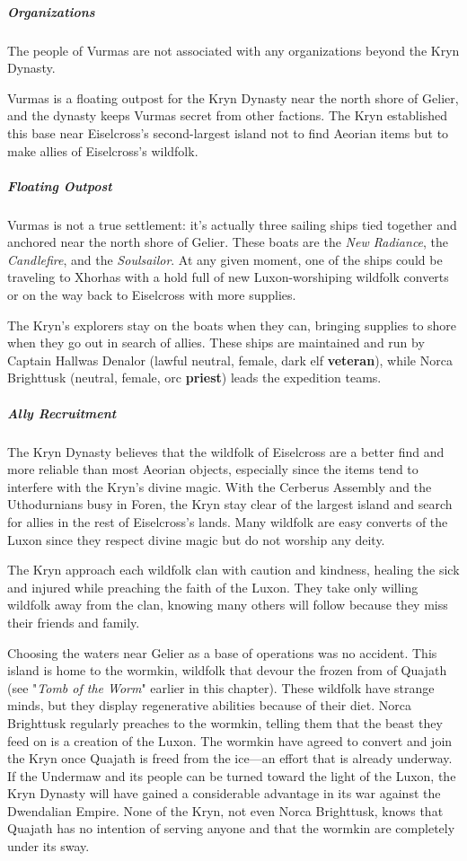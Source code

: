 \documentclass[10pt,a4paper,twoside,bg=print,twocolumn,openany,nodeprecatedcode]{dndbook}
\begin{document}
\subparagraph{Organizations}
The people of Vurmas are not associated with any organizations beyond the Kryn Dynasty.

Vurmas is a floating outpost for the Kryn Dynasty near the north shore of Gelier, and the dynasty keeps Vurmas secret from other factions. The Kryn established this base near Eiselcross's second-largest island not to find Aeorian items but to make allies of Eiselcross's wildfolk.

\subparagraph{Floating Outpost}
Vurmas is not a true settlement: it's actually three sailing ships tied together and anchored near the north shore of Gelier. These boats are the \textit{New Radiance}, the \textit{Candlefire}, and the \textit{Soulsailor}. At any given moment, one of the ships could be traveling to Xhorhas with a hold full of new Luxon-worshiping wildfolk converts or on the way back to Eiselcross with more supplies.

The Kryn's explorers stay on the boats when they can, bringing supplies to shore when they go out in search of allies. These ships are maintained and run by Captain Hallwas Denalor (lawful neutral, female, dark elf \textbf{veteran}), while Norca Brighttusk (neutral, female, orc \textbf{priest}) leads the expedition teams.

\subparagraph{Ally Recruitment}
The Kryn Dynasty believes that the wildfolk of Eiselcross are a better find and more reliable than most Aeorian objects, especially since the items tend to interfere with the Kryn's divine magic. With the Cerberus Assembly and the Uthodurnians busy in Foren, the Kryn stay clear of the largest island and search for allies in the rest of Eiselcross's lands. Many wildfolk are easy converts of the Luxon since they respect divine magic but do not worship any deity.

The Kryn approach each wildfolk clan with caution and kindness, healing the sick and injured while preaching the faith of the Luxon. They take only willing wildfolk away from the clan, knowing many others will follow because they miss their friends and family.

Choosing the waters near Gelier as a base of operations was no accident. This island is home to the wormkin, wildfolk that devour the frozen from of Quajath (see "\textit{Tomb of the Worm}" earlier in this chapter). These wildfolk have strange minds, but they display regenerative abilities because of their diet. Norca Brighttusk regularly preaches to the wormkin, telling them that the beast they feed on is a creation of the Luxon. The wormkin have agreed to convert and join the Kryn once Quajath is freed from the ice—an effort that is already underway. If the Undermaw and its people can be turned toward the light of the Luxon, the Kryn Dynasty will have gained a considerable advantage in its war against the Dwendalian Empire. None of the Kryn, not even Norca Brighttusk, knows that Quajath has no intention of serving anyone and that the wormkin are completely under its sway.
\end{document}
